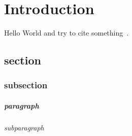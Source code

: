 \chapter{Introduction}


Hello World and try to cite something~\cite{Yang_2016}.

\section{section}
\lipsum[1-2]

\subsection{subsection}
\lipsum[3-4]

\paragraph{paragraph}
\lipsum[5]

\subparagraph{subparagraph}
\lipsum[6]
